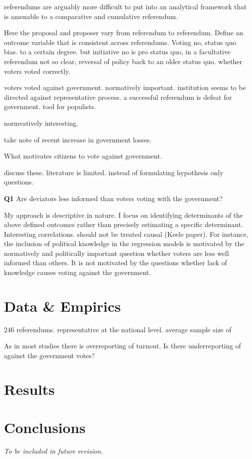 \documentclass[11pt,a4paper]{article}
\begin{document}
referendums are arguably more difficult to put into an analytical framework that is amenable to a comparative and cumulative referendum.

Here the proposal and proposer vary from referendum to referendum. 
Define an outcome variable that is consistent across referendums. Voting no, status quo bias. to a certain degree. but initiative no is pro status quo, in a facultative referendum not so clear, reversal of policy back to an older status quo. whether voters voted correctly. 

voters voted against government. normatively important. institution seems to be directed against representative process. a successful referendum is defeat for government. tool for populists.

normvatively interesting.

take note of recent increase in government losses.

What motivates citizens to vote against government.

discuss these. literature is limited. instead of formulating hypothesis only questions.

\textbf{Q1} Are deviators less informed than voters voting with the government?

My approach is descriptive in nature. I focus on identifying determinants of the above defined outcomes rather than precisely estimating a specific determinant. Interesting correlations. should not be treated causal (Keele paper). For instance, the inclusion of political knowledge in the regression models is motivated by the normatively and politically important question whether voters are less well informed than others. It is not motivated by the questions whether lack of knowledge causes voting against the government.

\section{Data \& Empirics}

246 referendums. representative at the national level. average sample size of 

As in most studies there is overreporting of turnout. Is there underreporting of against the government votes?

\section{Results}

\section{Conclusions}

\textit{To be included in future revision.}
\end{document}
